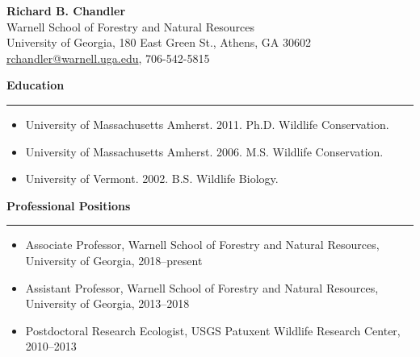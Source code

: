 \singlespacing
\thispagestyle{plain} %

\begin{center}
{\large \bf Richard B. Chandler} \\
Warnell School of Forestry and Natural Resources \\ %
University of Georgia, %
180 East Green St., Athens, GA 30602 \\
\href{mailto:rchandler@warnell.uga.edu}{rchandler@warnell.uga.edu},  %
706-542-5815 \\
\end{center}


\vspace{0.8cm}

{\large \bf Education} \\
\rule[3mm]{\textwidth}{0.3mm}

\begin{itemize}
    \item \textnormal{University of Massachusetts Amherst}. 2011. Ph.D. Wildlife Conservation. 
    \item \textnormal{University of Massachusetts Amherst}. 2006. M.S. Wildlife Conservation. 
    \item \textnormal{University of Vermont}. 2002. B.S. Wildlife Biology. 
\end{itemize}


\vspace{0.5cm}

{\large \bf Professional Positions} \\
\rule[3mm]{\textwidth}{0.3mm}

\begin{itemize}

\item \textnormal{Associate Professor}, Warnell School of Forestry and
  Natural Resources, 
  University of Georgia, 2018--present

\item \textnormal{Assistant Professor}, Warnell School of Forestry and
  Natural Resources, 
  University of Georgia, 2013--2018
  
\item \textnormal{Postdoctoral Research Ecologist}, USGS Patuxent
  Wildlife Research Center, 2010--2013

\end{itemize}


